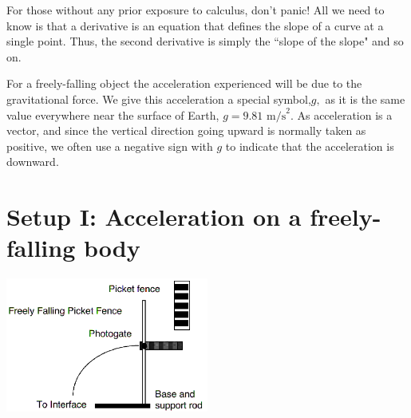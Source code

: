 \documentclass[main.tex]{subfiles}
\begin{document}
For those without any prior exposure to calculus, don't panic!  All we need to know is that a derivative is an equation that defines the slope of a curve at a single point. Thus, the second derivative is simply the ``slope of the slope" and so on.

For a freely-falling object the acceleration experienced will be due to the gravitational force. We give this acceleration a special symbol,$g,$ as it is the same value everywhere near the surface of Earth, $g=9.81\text{ m/s}^2.$ As acceleration is a vector, and since the vertical direction going upward is normally taken as positive, we often use a negative sign with $g$ to indicate that the acceleration is downward.

\section{Setup I: Acceleration on a freely-falling body}
\begin{center}
\includegraphics[width=0.5\textwidth]{Accel_1_Setup}
\end{center}
\end{document}

